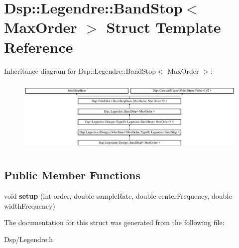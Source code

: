 \hypertarget{structDsp_1_1Legendre_1_1BandStop}{\section{Dsp\-:\-:Legendre\-:\-:Band\-Stop$<$ Max\-Order $>$ Struct Template Reference}
\label{structDsp_1_1Legendre_1_1BandStop}
}
Inheritance diagram for Dsp\-:\-:Legendre\-:\-:Band\-Stop$<$ Max\-Order $>$\-:\begin{figure}[H]
\begin{center}
\leavevmode
\includegraphics[height=3.628510cm]{structDsp_1_1Legendre_1_1BandStop}
\end{center}
\end{figure}
\subsection*{Public Member Functions}
\begin{DoxyCompactItemize}
\item 
\hypertarget{structDsp_1_1Legendre_1_1BandStop_a8c73f17aebfee953e349536d74070a73}{void {\bfseries setup} (int order, double sample\-Rate, double center\-Frequency, double width\-Frequency)}\label{structDsp_1_1Legendre_1_1BandStop_a8c73f17aebfee953e349536d74070a73}

\end{DoxyCompactItemize}


The documentation for this struct was generated from the following file\-:\begin{DoxyCompactItemize}
\item 
Dsp/Legendre.\-h\end{DoxyCompactItemize}
